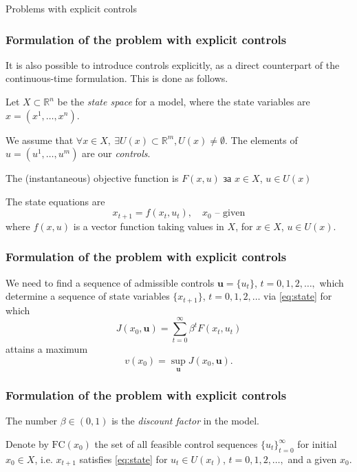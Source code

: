 \documentclass[10pt]{beamer}
\theoremstyle{definition}
\begin{document}
\begin{section}{Problems with explicit controls}\label{sec:explcontr}

\begin{frame}[fragile]
\frametitle{Formulation of the problem with explicit controls}
It is also possible to introduce controls explicitly, as a direct counterpart of the continuous-time formulation. This is done as follows.\bigskip

Let $X \subset \mathbb{R}^n$ be the \emph{state space} for a model, where the state variables are $x=(x^1,\ldots,x^n)$. \bigskip

We assume that $\forall x \in X,~ \exists U(x) \subset \mathbb{R}^m, U(x)\neq \emptyset$. The elements of $u=(u^1,\ldots,u^m)$ are our \emph{controls}. \bigskip

The (instantaneous) objective function is $F(x,u)$ за $x \in X$, $u \in U(x)$ \bigskip

The state equations are
\begin{equation}
x_{t+1}=f(x_t,u_t),\quad x_0 \text{ -- given} \label{eq:state}
\end{equation}
where $f(x,u)$ is a vector function taking values in $X$, for $x \in X$, $u \in U(x)$.\bigskip
\end{frame}



\begin{frame}[fragile]
\frametitle{Formulation of the problem with explicit controls}

We need to find a sequence of admissible controls $\mathbf{u} = \{u_t\}$, $t=0,1,2,\ldots,$
which determine a sequence of state variables $\{ x_{t+1} \}$, $t=0,1,2,\ldots$ via \eqref{eq:state} for which \begin{equation}
J(x_0,\mathbf{u})=\sum_{t=0}^\infty
\beta^t F(x_t,u_t)\label{eq:obj}
\end{equation} attains a maximum \begin{equation}
v(x_0)=\sup_{\mathbf{u}} J(x_0,\mathbf{u}).  
\label{eq:objMax}
\end{equation} 
\end{frame}



\begin{frame}[fragile]
\frametitle{Formulation of the problem with explicit controls}
The number $\beta \in (0,1)$ is the \emph{discount factor} in the model. \bigskip

Denote by $\textrm{FC}(x_0)$ the set of all feasible control sequences $\{ u_t\}_{t=0}^\infty$ for initial $x_0 \in X$, i.e. $ x_{t+1} $
satisfies \eqref{eq:state} for $ u_t \in U(x_t)$, $t=0,1,2,\ldots,$
and a given $x_0$. \bigskip


\end{frame}
\end{section}
\end{document}
